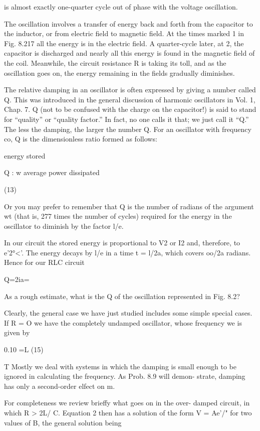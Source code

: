 is almost exactly one-quarter cycle out of phase with the voltage
oscillation.

The oscillation involves a transfer of energy back and forth from
the capacitor to the inductor, or from electric field to magnetic field.
At the times marked 1 in Fig. 8.217 all the energy is in the electric field.
A quarter-cycle later, at 2, the capacitor is discharged and nearly all
this energy is found in the magnetic field of the coil. Meanwhile, the
circuit resistance R is taking its toll, and as the oscillation goes on,
the energy remaining in the fields gradually diminishes.

The relative damping in an oscillator is often expressed by giving a
number called Q. This was introduced in the general discussion of
harmonic oscillators in Vol. 1, Chap. 7. Q (not to be confused with
the charge on the capacitor!) is said to stand for ``quality'' or ``quality
factor.'' In fact, no one calls it that; we just call it ``Q.'' The less
the damping, the larger the number Q. For an oscillator with frequency
co, Q is the dimensionless ratio formed as follows:

energy stored

Q : w average power dissipated

(13)

Or you may prefer to remember that Q is the number of radians of
the argument wt (that is, 277 times the number of cycles) required for
the energy in the oscillator to diminish by the factor l/e.

In our circuit the stored energy is proportional to V2 or I2 and,
therefore, to e'2°<'. The energy decays by l/e in a time t = l/2a,
which covers oo/2a radians. Hence for our RLC circuit

Q=2ia=%

As a rough estimate, what is the Q of the oscillation represented in
Fig. 8.2?

Clearly, the general case we have just studied includes some simple
special cases. If R = O we have the completely undamped oscillator,
whose frequency we is given by

0.10 =L (15)

\/T
Mostly we deal with systems in which the damping is small enough
to be ignored in calculating the frequency. As Prob. 8.9 will demon-
strate, damping has only a second-order elfect on m.

For completeness we review brieffy what goes on in the over-
damped circuit, in which R > 2\/L/ C. Equation 2 then has a solution
of the form V = Ae'/" for two values of B, the general solution
being

